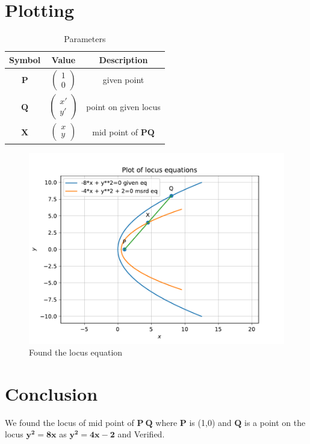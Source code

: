 \documentclass[journal,10pt,twocolumn]{article}
\newcommand{\myvec}[1]{\ensuremath{\begin{pmatrix}#1\end{pmatrix}}}
\let\vec\mathbf
\let\vec\mathbf
\begin{document}
\raggedright \section{Plotting}
{\begin{table}[h]
    \centering
    \begin{tabular}{|c|c|c|}
       \hline
       \textbf{Symbol}&\textbf{Value}&\textbf{Description}  \\
       \hline
	    $\vec{P}$ & $\myvec{
		    1\\
		    0}$
	    & given point\\
        \hline
	    $\vec{Q}$ & $\myvec{x'\\y'}$
 &  point on given locus \\
        \hline
	    $\vec{X}$ & $\myvec{x\\y}$
 & mid point of $\vec{PQ}$  \\
       \hline
    \end{tabular}
    \caption{Parameters}
    \label{tab:my_label}
\end{table}

\begin{figure}[h]
    \centering
\includegraphics[width=\columnwidth]{fig/conicfig.pdf}
    \caption{Found the locus equation }
    \label{fig:my_label}
\end{figure}
\vspace{2cm}
}
\raggedright \section{Conclusion}
\begin{center}
We found the locus of mid point of $\vec{P\:Q}$ where $\vec{P}$ is (1,0) and $\vec{Q}$ is a point on the locus $\vec{y^{2} = 8x}$ as $\vec{y^{2} = 4x - 2}$ and Verified.
\end{center}
\end{document}
